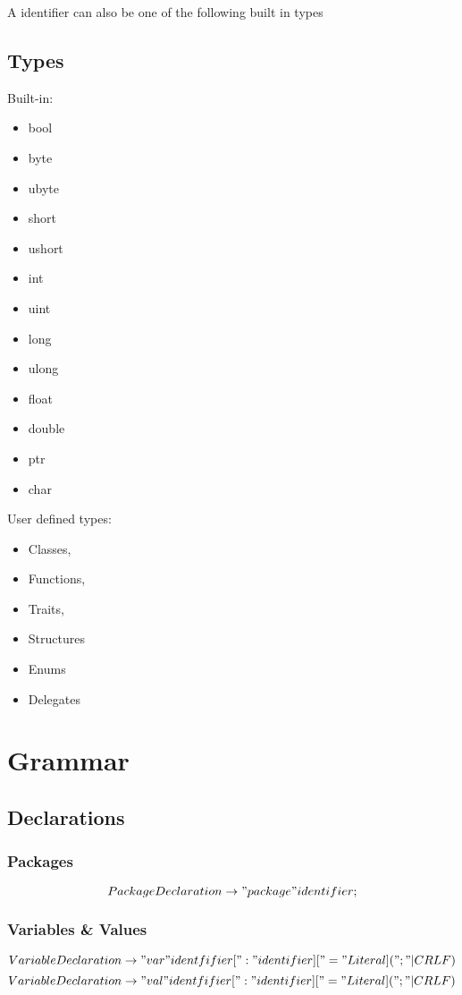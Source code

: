 \documentclass[a4paper]{article}
\begin{document}
A identifier can also be one of the following built in types
\subsection{Types}
Built-in:

\begin{multicols}{4}
\begin{itemize}
\item bool 
\item byte 
\item ubyte 
\item short 
\item ushort 
\item int 
\item uint 
\item long 
\item ulong 
\item float 
\item double 
\item ptr 
\item char 
\end{itemize}
\end{multicols}

User defined types:

\begin{itemize}
\item Classes, 
\item Functions, 
\item Traits, 
\item Structures
\item Enums
\item Delegates

\end{itemize}


\section{Grammar}

\subsection{Declarations}

\subsubsection*{Packages}
\[PackageDeclaration \rightarrow "package" identifier;\]

\subsubsection*{Variables \& Values}
\[VariableDeclaration \rightarrow "var" identfifier [":" identifier] ["=" Literal] (";" | CRLF)\]
\[VariableDeclaration \rightarrow "val" identfifier [":" identifier] ["=" Literal] (";" | CRLF)\]
\end{document}
